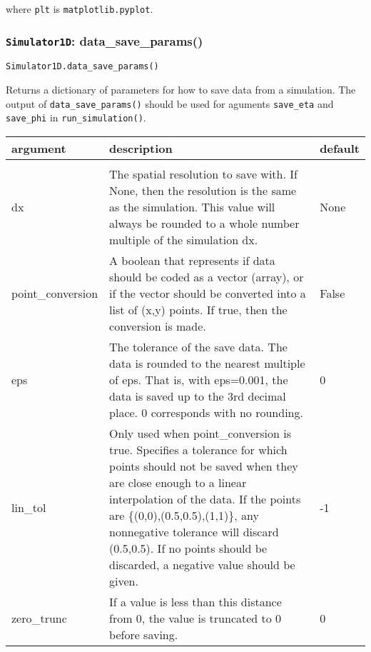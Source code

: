 \documentclass[10pt,a4paper]{article}
\newenvironment{optarglist}
    {\begin{center}
    \begin{tabular}{l|p{10cm}|l}
    argument & description & default\\
    \hline\\
    }
    { 
    \end{tabular} 
    \end{center}
    }
\begin{document}
where \texttt{plt} is \texttt{matplotlib.pyplot}.



\subsubsection{\texttt{Simulator1D}: data\_save\_params()}
\texttt{Simulator1D.data\_save\_params()}

Returns a dictionary of parameters for how to save data from a simulation. The output of \texttt{data\_save\_params()} should be used for aguments \texttt{save\_eta} and \texttt{save\_phi} in \texttt{run\_simulation()}.

\begin{optarglist}
        dx    
              & The spatial resolution to save with. If None, then the
                resolution is the same as the simulation. This value
                will always be rounded to a whole number multiple of
                the simulation dx. & None \\\hline

        point\_conversion
              & A boolean that represents if data should be coded as
                a vector (array), or if the vector should be converted
                into a list of (x,y) points. If true, then the conversion
                is made. & False \\\hline

        eps
              & The tolerance of the save data. The data is rounded to the 
                nearest multiple of eps. That is, with eps=0.001, the data
                is saved up to the 3rd decimal place. 0 corresponds with
                no rounding. & 0\\\hline
        
        lin\_tol
             & Only used when point\_conversion is true. Specifies a tolerance
                for which points should not be saved when they are close enough
                to a linear interpolation of the data. If the points are 
                \{(0,0),(0.5,0.5),(1,1)\}, any nonnegative tolerance will discard
                (0.5,0.5). If no points should be discarded, a negative value
                should be given. & -1\\\hline
        
        zero\_trunc
              & If a value is less than this distance from 0, the value is 
                truncated to 0 before saving.& 0
\end{optarglist}
\end{document}
